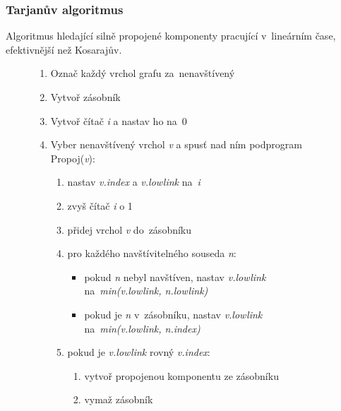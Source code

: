 \subsubsection{Tarjanův algoritmus}

Algoritmus hledající silně propojené komponenty pracující v~lineárním čase, efektivnější než Kosarajův.

\begin{figure}[ht]
\onehalfspacing
\begin{enumerate}
\item Označ každý vrchol grafu za~nenavštívený
\item Vytvoř zásobník
\item Vytvoř čítač \emph{i} a nastav ho na~0
\item Vyber nenavštívený vrchol \emph{v} a spusť nad ním podprogram Propoj(\emph{v}):
    \begin{enumerate}
    \item nastav \emph{v.index} a \emph{v.lowlink} na~\emph{i}
    \item zvyš čítač \emph{i} o 1
    \item přidej vrchol \emph{v} do~zásobníku
    \item pro každého navštívitelného souseda \emph{n}:
        \begin{itemize}
        \item pokud \emph{n} nebyl navštíven, nastav \emph{v.lowlink} na~\emph{min(v.lowlink, n.lowlink)}
        \item pokud je \emph{n} v~zásobníku, nastav \emph{v.lowlink} na~\emph{min(v.lowlink, n.index)}
        \end{itemize}
    \item pokud je \emph{v.lowlink} rovný \emph{v.index}:
        \begin{enumerate}
        \item vytvoř propojenou komponentu ze zásobníku
        \item vymaž zásobník
        \end{enumerate}
    \end{enumerate}
\end{enumerate}
\end{figure}
\FloatBarrier

